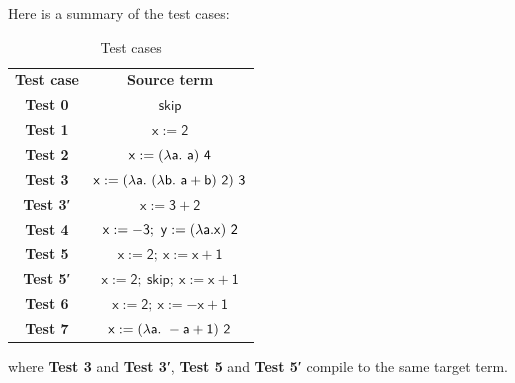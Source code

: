 \documentclass[12pt,a4paper]{report}
\theoremstyle{definition}
\begin{document}
    Here is a summary of the test cases:
    \begin{table}[H]
        \centering
        \begin{tabular}{| c | c |}
            \hline
            \textbf{Test case} & \textbf{Source term} \\
            \hhline{|=|=|}
            \textbf{Test 0} & $\mathsf{skip}$ \\
            \hline
            \textbf{Test 1} & $\mathsf{x := 2}$ \\
            \hline
            \textbf{Test 2} & $\mathsf{x := (\mathnormal{\lambda} a.\ a)\ 4}$ \\
            \hline
            \textbf{Test 3} & $\mathsf{x := (\mathnormal{\lambda} a.\ (\mathnormal{\lambda} b.\ a+b)\ 2)\ 3}$ \\
            \hline
            \textbf{Test 3′} & $\mathsf{x := 3 + 2}$ \\
            \hline
            \textbf{Test 4} & $\mathsf{x := -3;\ y := (\mathnormal{\lambda} a. x)\ 2}$ \\
            \hline
            \textbf{Test 5} & $\mathsf{x := 2;\ x := x + 1}$ \\
            \hline
            \textbf{Test 5′} & $\mathsf{x := 2;\ skip;\ x := x + 1}$ \\
            \hline
            \textbf{Test 6} & $\mathsf{x := 2;\ x := -x + 1}$ \\
            \hline
            \textbf{Test 7} & $\mathsf{x := (\mathnormal{\lambda} a.\ -a+1)\ 2}$ \\
            \hline
        \end{tabular}
        \caption{Test cases}
        \label{tab: test_cases}
    \end{table}
    where \textbf{Test 3} and \textbf{Test 3′}, \textbf{Test 5} and \textbf{Test 5′} compile to the same target term. 
    
\end{document}
